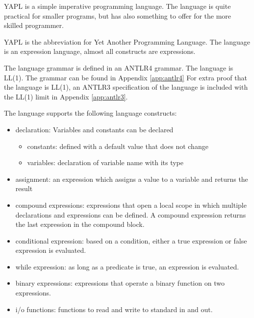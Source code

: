 YAPL is a simple imperative programming language. The language is quite practical for smaller programs, but has also something to offer for the more skilled programmer.


YAPL is the abbreviation for Yet Another Programming Language. The language is an expression language, almost all constructs are expressions.

The language grammar is defined in an ANTLR4 grammar. The language is LL(1). The grammar can be found in Appendix \ref{app:antlr4} For extra proof that the language is LL(1), an ANTLR3 specification of the language is included with the LL(1) limit in Appendix \ref{app:antlr3}. 

The language supports the following language constructs:

\begin{itemize}
\item declaration: Variables and constants can be declared
\begin{itemize}
\item constants: defined with a default value that does not change
\item variables: declaration of variable name with its type
\end{itemize}
\item assignment: an expression which assigns a value to a variable and returns the result
\item compound expressions: expressions that open a local scope in which multiple declarations and expressions can be defined. A compound expression returns the last expression in the compound block.
\item conditional expression: based on a condition, either a true expression or false expression is evaluated.
\item while expression: as long as a predicate is true, an expression is evaluated.
\item binary expressions: expressions that operate a binary function on two expressions.
\item i/o functions: functions to read and write to standard in and out.
\end{itemize}